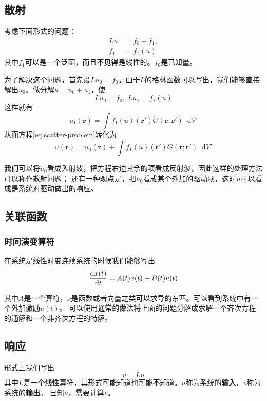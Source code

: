 \documentclass[UTF8, a4paper]{ctexart}
\newcommand*{\diff}{\mathop{}\!\mathrm{d}}
\begin{document}
\subsection{散射}
考虑下面形式的问题：
\begin{equation}
    \begin{aligned}
        L u &= f_0 + f_1, \\
        f_1 &= f_1 (u)
    \end{aligned}
    \label{eq:scatter-problem}
\end{equation}
其中$f_1$可以是一个泛函，而且不见得是线性的。$f_0$是已知量。

为了解决这个问题，首先设$Lu_0=f_0$。由于$L$的格林函数可以写出，我们能够直接解出$u_0$。做分解$u=u_0+u_1$，使
\[
    L u_0 = f_0, \; L u_1 = f_1(u)
\]
这样就有
\[
    u_1(\boldsymbol{r}) = \int f_1(u)(\boldsymbol{r}') G(\boldsymbol{r};\boldsymbol{r}') \diff V'
\]
从而方程\eqref{eq:scatter-problem}转化为
\begin{equation}
    u(\boldsymbol{r}) = u_0(\boldsymbol{r}) + \int f_1(u)(\boldsymbol{r}')G(\boldsymbol{r};\boldsymbol{r}') \diff V'
    \label{eq:scatter-form}
\end{equation}

我们可以将$u_0$看成入射波，把方程右边其余的项看成反射波，因此这样的处理方法可以称作散射问题；
还有一种观点是，把$u_0$看成某个外加的驱动项，这时$u$可以看成是系统对驱动做出的响应。

\subsection{关联函数}

\subsubsection{时间演变算符}
在系统是线性时变连续系统的时候我们能够写出
\begin{equation}
    \dv{x(t)}{t} = A(t) x(t) + B(t) u(t)
\end{equation}

其中$A$是一个算符，$x$是函数或者向量之类可以求导的东西。可以看到系统中有一个外加激励$u(t)$。
可以使用通常的做法将上面的问题分解成求解一个齐次方程的通解和一个非齐次方程的特解。

\subsection{响应}
形式上我们写出
\begin{equation}
    v = L u
\end{equation}
其中$L$是一个线性算符，其形式可能知道也可能不知道。$u$称为系统的\textbf{输入}，$v$称为系统的\textbf{输出}。
已知$u$，需要计算$v$。
\end{document}
